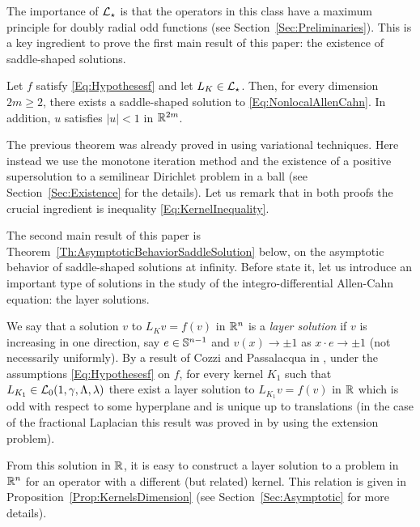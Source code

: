 The importance of $\mathcal{L}_\star$ is that the operators in this class have a maximum principle for doubly radial odd functions (see Section~\ref{Sec:Preliminaries}). This is a key ingredient to prove the first main result of this paper: the existence of saddle-shaped solutions.

\begin{theorem}
	\label{Th:Existence}
	Let $f$ satisfy \eqref{Eq:Hypothesesf} and let $L_K\in \mathcal{L}_\star$. Then, for every dimension $2m \geq 2$, there exists a saddle-shaped solution to \eqref{Eq:NonlocalAllenCahn}. In addition, $u$ satisfies $|u|<1$ in $\mathbb{R}^{2m}$.
\end{theorem}

The previous theorem was already proved in \cite{FelipeSanz-Perela:IntegroDifferentialI} using variational techniques. Here instead we use the monotone iteration method and the existence of a positive supersolution to a semilinear Dirichlet problem in a ball (see Section~\ref{Sec:Existence} for the details). Let us remark that in both proofs the crucial ingredient is inequality \eqref{Eq:KernelInequality}.


The second main result of this paper is Theorem~\ref{Th:AsymptoticBehaviorSaddleSolution} below, on the asymptotic behavior of saddle-shaped solutions at infinity. Before state it, let us introduce an important type of solutions in the study of the integro-differential Allen-Cahn equation: the layer solutions.


We say that a solution $v$ to $L_K v = f(v)$ in $\mathbb{R}^n$ is a \emph{layer solution} if $v$ is increasing in one direction, say $e\in \mathbb{S}^{n-1}$ and $v(x) \to \pm 1$ as $x\cdot e \to \pm 1$ (not necessarily uniformly). By a result of Cozzi and Passalacqua in \cite{CozziPassalacqua}, under the assumptions \eqref{Eq:Hypothesesf} on $f$, for every kernel $K_1$ such that $L_{K_1}\in \mathcal{L}_0(1,\gamma,\Lambda, \lambda)$ there exist a layer solution  to $L_{K_1} v = f(v)$ in $\mathbb{R}$ which is odd with respect to some hyperplane and is unique up to translations (in the case of the fractional Laplacian this result was proved in \cite{CabreSolaMorales,CabreSireII} by using the extension problem). 

From this solution in $\mathbb{R}$, it is easy to construct a layer solution to a problem in $\mathbb{R}^n$ for an operator with a different (but related) kernel. This relation is given in Proposition~\ref{Prop:KernelsDimension} (see Section~\ref{Sec:Asymptotic} for more details). 


